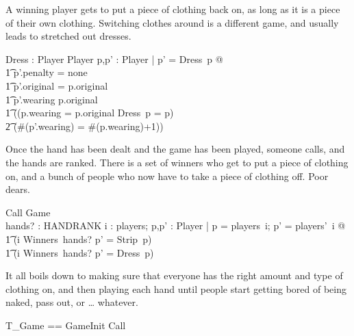 \documentclass[11pt]{article}
\begin{document}
A winning player gets to put a piece of clothing back on, as long as it is a piece of their own
clothing.  Switching clothes around is a different game, and usually leads to stretched out dresses.
\begin{axdef}
  Dress : Player \rel Player
  \where
  \forall p,p' : Player | p' = Dress~p @ \\
  \t1 p'.penalty = none \land \\
  \t1 p'.original = p.original \land \\
  \t1 p'.wearing \subseteq p.original \land \\
  \t1 ((p.wearing = p.original \land Dress~p = p) \lor \\
  \t2  (\#(p'.wearing) = \#(p.wearing)+1))
\end{axdef}

Once the hand has been dealt and the game has been played, someone calls, and the hands are ranked.
There is a set of winners who get to put a piece of clothing on, and a bunch of people who now have
to take a piece of clothing off.  Poor dears.
\begin{schema}{Call}
  \Delta Game \\
  hands?  : \seq HANDRANK
  \where
  \forall i : \dom players; p,p' : Player | p = players~i; p' = players'~i @ \\
  \t1 (i \notin Winners~hands?  \land p' = Strip~p) \lor \\
  \t1 (i \in Winners~hands?  \land p' = Dress~p)
\end{schema}

It all boils down to making sure that everyone has the right amount and type of clothing on, and
then playing each hand until people start getting bored of being naked, pass out, or \ldots
whatever.
\begin{zed}
  T\_Game == GameInit \semi Call
\end{zed}
\end{document}
